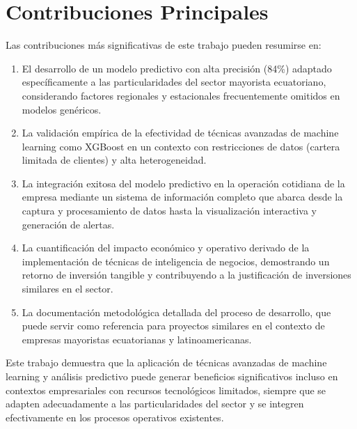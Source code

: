 \section{Contribuciones Principales}

Las contribuciones más significativas de este trabajo pueden resumirse en:

\begin{enumerate}
    \item El desarrollo de un modelo predictivo con alta precisión (84\%) adaptado específicamente a las particularidades del sector mayorista ecuatoriano, considerando factores regionales y estacionales frecuentemente omitidos en modelos genéricos.
    
    \item La validación empírica de la efectividad de técnicas avanzadas de machine learning como XGBoost en un contexto con restricciones de datos (cartera limitada de clientes) y alta heterogeneidad.
    
    \item La integración exitosa del modelo predictivo en la operación cotidiana de la empresa mediante un sistema de información completo que abarca desde la captura y procesamiento de datos hasta la visualización interactiva y generación de alertas.
    
    \item La cuantificación del impacto económico y operativo derivado de la implementación de técnicas de inteligencia de negocios, demostrando un retorno de inversión tangible y contribuyendo a la justificación de inversiones similares en el sector.
    
    \item La documentación metodológica detallada del proceso de desarrollo, que puede servir como referencia para proyectos similares en el contexto de empresas mayoristas ecuatorianas y latinoamericanas.
\end{enumerate}

Este trabajo demuestra que la aplicación de técnicas avanzadas de machine learning y análisis predictivo puede generar beneficios significativos incluso en contextos empresariales con recursos tecnológicos limitados, siempre que se adapten adecuadamente a las particularidades del sector y se integren efectivamente en los procesos operativos existentes.
